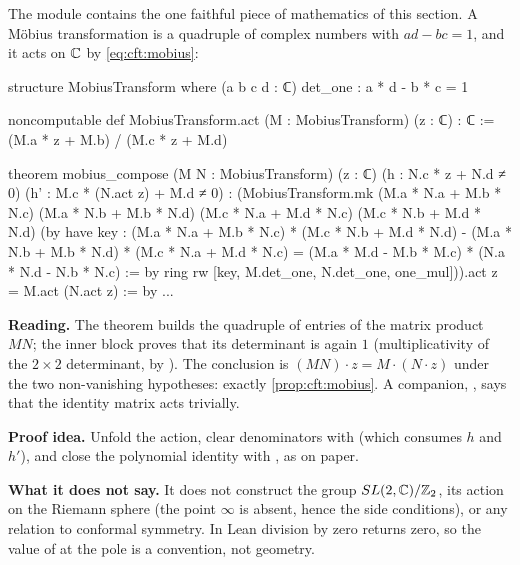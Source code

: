 The module  contains the one faithful piece of mathematics of this section.
A M\"obius transformation is a quadruple of complex numbers with $ad-bc=1$, and it acts on $\mathbb{C}$
by \eqref{eq:cft:mobius}:
\begin{leancode}
structure MobiusTransform where
  (a b c d : ℂ)
  det_one : a * d - b * c = 1

noncomputable def MobiusTransform.act (M : MobiusTransform) (z : ℂ) : ℂ :=
  (M.a * z + M.b) / (M.c * z + M.d)
\end{leancode}
\begin{leanbox}
\begin{leancode}
theorem mobius_compose (M N : MobiusTransform) (z : ℂ)
    (h : N.c * z + N.d ≠ 0)
    (h' : M.c * (N.act z) + M.d ≠ 0) :
    (MobiusTransform.mk
      (M.a * N.a + M.b * N.c)
      (M.a * N.b + M.b * N.d)
      (M.c * N.a + M.d * N.c)
      (M.c * N.b + M.d * N.d)
      (by
        have key : (M.a * N.a + M.b * N.c) * (M.c * N.b + M.d * N.d)
            - (M.a * N.b + M.b * N.d) * (M.c * N.a + M.d * N.c)
            = (M.a * M.d - M.b * M.c) * (N.a * N.d - N.b * N.c) := by ring
        rw [key, M.det_one, N.det_one, one_mul])).act z =
    M.act (N.act z) := by ...
\end{leancode}
\textbf{Reading.} The theorem builds the quadruple of entries of the matrix product $MN$; the inner  block
proves that its determinant is again $1$ (multiplicativity of the $2\times2$ determinant, by
). The conclusion is $(MN)\cdot z=M\cdot(N\cdot z)$ under the two non-vanishing
hypotheses: exactly \cref{prop:cft:mobius}. A companion, , says that
the identity matrix acts trivially.

\textbf{Proof idea.} Unfold the action, clear denominators with  (which consumes
$h$ and $h'$), and close the polynomial identity with , as on paper.

\textbf{What it does not say.} It does not construct the group $SL(2,\mathbb{C})/\mathbb{Z}_2$, its action on the
Riemann sphere (the point $\infty$ is absent, hence the side conditions), or any relation to
conformal symmetry. In Lean division by zero returns zero, so the value of  at the pole
is a convention, not geometry.
\end{leanbox}

